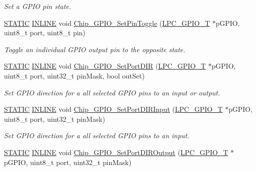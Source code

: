 \begin{DoxyCompactItemize}
\begin{DoxyCompactList}\small\item\em Set a G\+P\+IO pin state. \end{DoxyCompactList}\item 
\hyperlink{group__LPC__Types__Public__Macros_ga10b2d890d871e1489bb02b7e70d9bdfb}{S\+T\+A\+T\+IC} \hyperlink{group__LPC__Types__Public__Types_ga2eb6f9e0395b47b8d5e3eeae4fe0c116}{I\+N\+L\+I\+NE} void \hyperlink{group__GPIO__17XX__40XX_ga5437e5a8ae2ce7662b605f9961aad8f5}{Chip\+\_\+\+G\+P\+I\+O\+\_\+\+Set\+Pin\+Toggle} (\hyperlink{structLPC__GPIO__T}{L\+P\+C\+\_\+\+G\+P\+I\+O\+\_\+T} $\ast$p\+G\+P\+IO, uint8\+\_\+t port, uint8\+\_\+t pin)
\begin{DoxyCompactList}\small\item\em Toggle an individual G\+P\+IO output pin to the opposite state. \end{DoxyCompactList}\item 
\hyperlink{group__LPC__Types__Public__Macros_ga10b2d890d871e1489bb02b7e70d9bdfb}{S\+T\+A\+T\+IC} \hyperlink{group__LPC__Types__Public__Types_ga2eb6f9e0395b47b8d5e3eeae4fe0c116}{I\+N\+L\+I\+NE} void \hyperlink{group__GPIO__17XX__40XX_ga6ceffe51a34be90a077b22657b1f90f0}{Chip\+\_\+\+G\+P\+I\+O\+\_\+\+Set\+Port\+D\+IR} (\hyperlink{structLPC__GPIO__T}{L\+P\+C\+\_\+\+G\+P\+I\+O\+\_\+T} $\ast$p\+G\+P\+IO, uint8\+\_\+t port, uint32\+\_\+t pin\+Mask, bool out\+Set)
\begin{DoxyCompactList}\small\item\em Set G\+P\+IO direction for a all selected G\+P\+IO pins to an input or output. \end{DoxyCompactList}\item 
\hyperlink{group__LPC__Types__Public__Macros_ga10b2d890d871e1489bb02b7e70d9bdfb}{S\+T\+A\+T\+IC} \hyperlink{group__LPC__Types__Public__Types_ga2eb6f9e0395b47b8d5e3eeae4fe0c116}{I\+N\+L\+I\+NE} void \hyperlink{group__GPIO__17XX__40XX_ga09e433572db2ec8a3e30e508ee5bcbd0}{Chip\+\_\+\+G\+P\+I\+O\+\_\+\+Set\+Port\+D\+I\+R\+Input} (\hyperlink{structLPC__GPIO__T}{L\+P\+C\+\_\+\+G\+P\+I\+O\+\_\+T} $\ast$p\+G\+P\+IO, uint8\+\_\+t port, uint32\+\_\+t pin\+Mask)
\begin{DoxyCompactList}\small\item\em Set G\+P\+IO direction for a all selected G\+P\+IO pins to an input. \end{DoxyCompactList}\item 
\hyperlink{group__LPC__Types__Public__Macros_ga10b2d890d871e1489bb02b7e70d9bdfb}{S\+T\+A\+T\+IC} \hyperlink{group__LPC__Types__Public__Types_ga2eb6f9e0395b47b8d5e3eeae4fe0c116}{I\+N\+L\+I\+NE} void \hyperlink{group__GPIO__17XX__40XX_gaeeb23db039b2bf56ed96a9d6112fab69}{Chip\+\_\+\+G\+P\+I\+O\+\_\+\+Set\+Port\+D\+I\+R\+Output} (\hyperlink{structLPC__GPIO__T}{L\+P\+C\+\_\+\+G\+P\+I\+O\+\_\+T} $\ast$p\+G\+P\+IO, uint8\+\_\+t port, uint32\+\_\+t pin\+Mask)

\end{DoxyCompactItemize}

